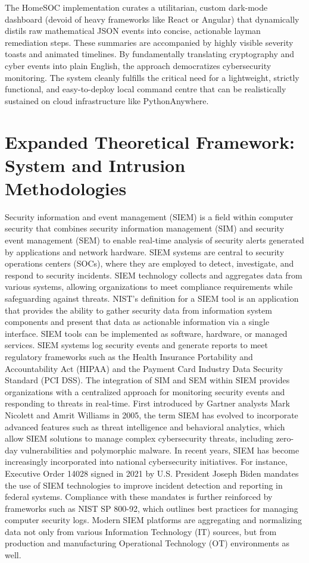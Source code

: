 The HomeSOC implementation curates a utilitarian, custom dark-mode dashboard (devoid of heavy frameworks like React or Angular) that dynamically distils raw mathematical JSON events into concise, actionable layman remediation steps. These summaries are accompanied by highly visible severity toasts and animated timelines. By fundamentally translating cryptography and cyber events into plain English, the approach democratizes cybersecurity monitoring. The system cleanly fulfills the critical need for a lightweight, strictly functional, and easy-to-deploy local command centre that can be realistically sustained on cloud infrastructure like PythonAnywhere.

\section{Expanded Theoretical Framework: System and Intrusion Methodologies}
Security information and event management (SIEM) is a field within computer security that combines security information management (SIM) and security event management (SEM) to enable real-time analysis of security alerts generated by applications and network hardware. SIEM systems are central to security operations centers (SOCs), where they are employed to detect, investigate, and respond to security incidents. SIEM technology collects and aggregates data from various systems, allowing organizations to meet compliance requirements while safeguarding against threats. NIST's definition for a SIEM tool is an application that provides the ability to gather security data from information system components and present that data as actionable information via a single interface.
SIEM tools can be implemented as software, hardware, or managed services. SIEM systems log security events and generate reports to meet regulatory frameworks such as the Health Insurance Portability and Accountability Act (HIPAA) and the Payment Card Industry Data Security Standard (PCI DSS). The integration of SIM and SEM within SIEM provides organizations with a centralized approach for monitoring security events and responding to threats in real-time.
First introduced by Gartner analysts Mark Nicolett and Amrit Williams in 2005, the term SIEM has evolved to incorporate advanced features such as threat intelligence and behavioral analytics, which allow SIEM solutions to manage complex cybersecurity threats, including zero-day vulnerabilities and polymorphic malware.
In recent years, SIEM has become increasingly incorporated into national cybersecurity initiatives. For instance, Executive Order 14028 signed in 2021 by U.S. President Joseph Biden mandates the use of SIEM technologies to improve incident detection and reporting in federal systems. Compliance with these mandates is further reinforced by frameworks such as NIST SP 800-92, which outlines best practices for managing computer security logs.
Modern SIEM platforms are aggregating and normalizing data not only from various Information Technology (IT) sources, but from production and manufacturing Operational Technology (OT) environments as well.


